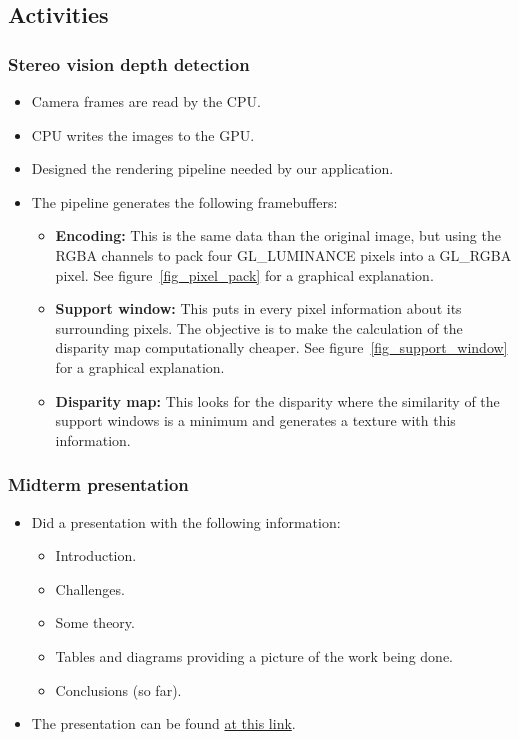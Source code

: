\subsection{Activities}


\subsubsection{Stereo vision depth detection}
\begin{itemize}
	\item Camera frames are read by the CPU.
	\item CPU writes the images to the GPU.
	\item Designed the rendering pipeline needed by our application.
	\item The pipeline generates the following framebuffers:
	\begin{itemize}
		\item \textbf{Encoding:} This is the same data than the original image, but using the RGBA channels to pack four GL\_LUMINANCE 	pixels into a GL\_RGBA pixel. See figure~\ref{fig_pixel_pack} for a graphical explanation.
		\item \textbf{Support window:} This puts in every pixel information about its surrounding pixels. The objective is to make the calculation of the disparity map computationally cheaper. See figure~\ref{fig_support_window} for a graphical explanation.
		\item \textbf{Disparity map:} This looks for the disparity where the similarity of the support windows is a minimum and generates a texture with this information.
	\end{itemize}
\end{itemize}





\subsubsection{Midterm presentation}
\begin{itemize}
	\item Did a presentation with the following information:
	\begin{itemize}
		\item Introduction.
		\item Challenges.
		\item Some theory.
		\item Tables and diagrams providing a picture of the work being done.
		\item Conclusions (so far).
	\end{itemize}
	\item The presentation can be found \href{https://docs.google.com/presentation/d/1_rqsAgTJxvEJvtRudIc00ItqAo_ZehuIC6Ru60WV8h8/edit?usp=sharing}{at this link}.
\end{itemize}

